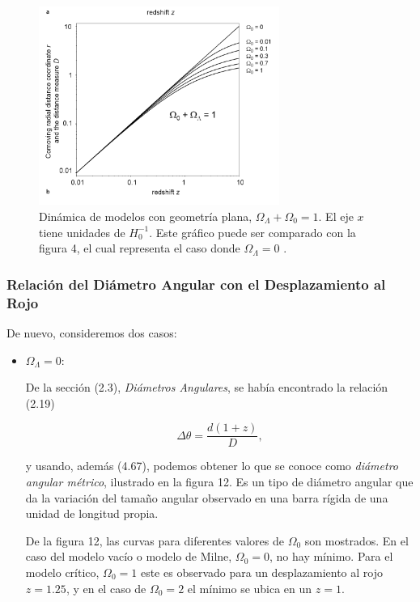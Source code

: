 \documentclass[11pt]{article}
\begin{document}
{    
    \begin{figure}[H]         
     \centering
     \includegraphics[width=0.7\textwidth]{redshift_r76b.png}
        \caption{\footnotesize{Dinámica de modelos con geometría plana, $\Omega_{\Lambda} + \Omega_0 = 1$. El eje $x$ tiene unidades de  $H_0^{-1}$. Este gráfico puede ser comparado con la figura 4, el cual representa el caso donde $\Omega_{\Lambda}=0$ .}}
     \end{figure}
    
    \subsubsection{Relación del Diámetro Angular con el Desplazamiento al Rojo}
    
    De nuevo, consideremos dos casos: 
    
    \begin{itemize}
        \item $\Omega_{\Lambda} =0$:
        
        De la sección (2.3), {\textit{Diámetros Angulares}}, se había encontrado la relación (2.19)
        
        \begin{equation}
            \Delta \theta  = \frac{d(1+z)}{D},
        \end{equation}
        
        y usando, además (4.67), podemos obtener lo que se conoce como {\textit{diámetro angular métrico}}, ilustrado en la figura 12. Es un tipo de diámetro angular que da la variación del tamaño angular observado en una barra rígida de una unidad de longitud propia. 
        
        De la figura 12, las curvas para diferentes valores de $\Omega_0$ son mostrados. En el caso del modelo vacío o modelo de Milne, $\Omega_0=0$, no hay mínimo. Para el modelo crítico, $\Omega_0=1$ este es observado para un desplazamiento al rojo $z=1.25$, y en el caso de $\Omega_0=2$ el mínimo se ubica en un $z=1$.
        

\end{itemize}}
\end{document}
